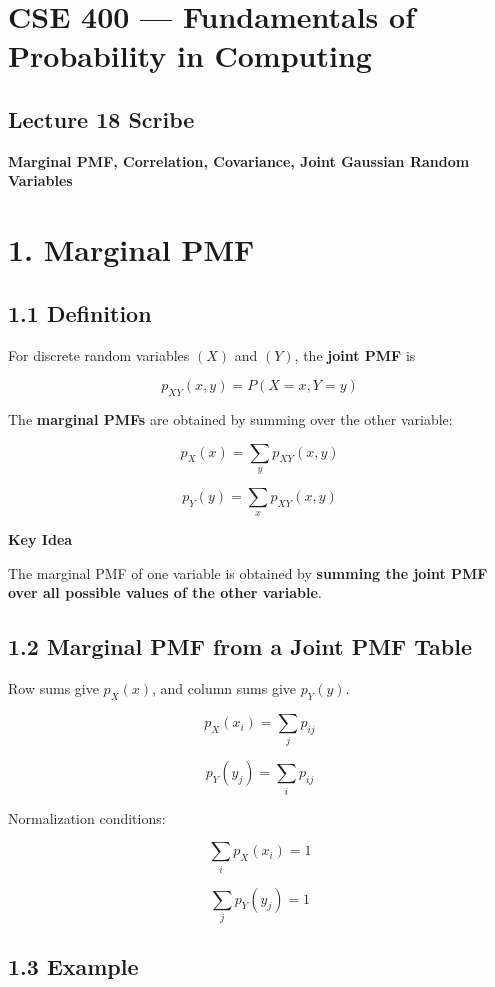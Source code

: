 \documentclass[12pt]{article}
\begin{document}
\section*{CSE 400 — Fundamentals of Probability in Computing}

\subsection*{Lecture 18 Scribe}

\textbf{Marginal PMF, Correlation, Covariance, Joint Gaussian Random Variables}

\section*{1. Marginal PMF}

\subsection*{1.1 Definition}

For discrete random variables $(X)$ and $(Y)$, the \textbf{joint PMF} is

\[
p_{XY}(x,y) = P(X=x, Y=y)
\]

The \textbf{marginal PMFs} are obtained by summing over the other variable:

\[
p_X(x) = \sum_y p_{XY}(x,y)
\]

\[
p_Y(y) = \sum_x p_{XY}(x,y)
\]

\textbf{Key Idea}

The marginal PMF of one variable is obtained by \textbf{summing the joint PMF over all possible values of the other variable}.

\subsection*{1.2 Marginal PMF from a Joint PMF Table}

Row sums give $p_X(x)$, and column sums give $p_Y(y)$.

\[
p_X(x_i) = \sum_j p_{ij}
\]

\[
p_Y(y_j) = \sum_i p_{ij}
\]

Normalization conditions:

\[
\sum_i p_X(x_i) = 1
\]

\[
\sum_j p_Y(y_j) = 1
\]

\subsection*{1.3 Example}
\end{document}
